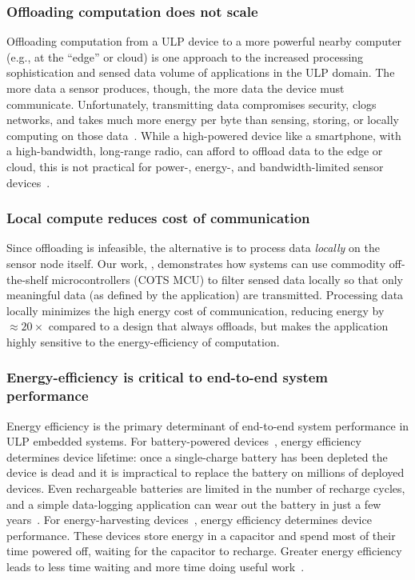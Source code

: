 \subsubsection{Offloading computation does not scale}
Offloading computation from a ULP device to a more powerful nearby computer (e.g., at the ``edge'' or cloud) is one approach to the increased processing sophistication and sensed data volume of applications in the ULP domain.
%
The more data a sensor produces, though, the more data the device must
communicate.
%
Unfortunately, transmitting data compromises security, clogs networks, and takes much more energy per byte than
sensing, storing, or locally computing on those data~\cite{sonic,zebranet}.  
%
While a high-powered device like a smartphone, with a high-bandwidth,
long-range radio, can afford to offload data to the edge or cloud,
this is not practical for power-, energy-, and bandwidth-limited sensor devices~\cite{dongare2017openchirp,sonic}.

\subsubsection{Local compute reduces cost of communication}
Since offloading is infeasible,
the alternative is to process data \emph{locally} on the sensor node itself.
% 
Our work, \sonic, demonstrates how systems can use commodity off-the-shelf microcontrollers (COTS MCU) to filter sensed data locally so that only meaningful data (as defined by the application) are transmitted.
% 
Processing data locally minimizes the high energy cost of communication, reducing energy by $\approx20\times$ compared to a design that always offloads, but makes the application highly sensitive to the energy-efficiency of computation.

\subsubsection{Energy-efficiency is critical to end-to-end system performance}
Energy efficiency is the primary determinant of end-to-end system performance in ULP embedded systems.
% 
For battery-powered devices~\cite{culler2002mica,rowe2011sensor}, energy efficiency determines device lifetime: once a single-charge battery has been depleted the device is dead and it is impractical to replace the battery on millions of deployed devices.
% 
Even rechargeable batteries are limited in the number of recharge cycles, and a simple data-logging application can wear out the battery in just a few years~\cite{jackson_2019,nardello2019camaroptera}.
% 
For energy-harvesting devices~\cite{colin2018reconfigurable,hester2015tragedy,flicker,moo,windware}, energy efficiency determines device performance.
% 
These devices store energy in a capacitor and spend most of their time powered off, waiting for the capacitor to recharge.
% 
Greater energy efficiency leads to less time waiting and more time doing useful work~\cite{desai2020power}.

